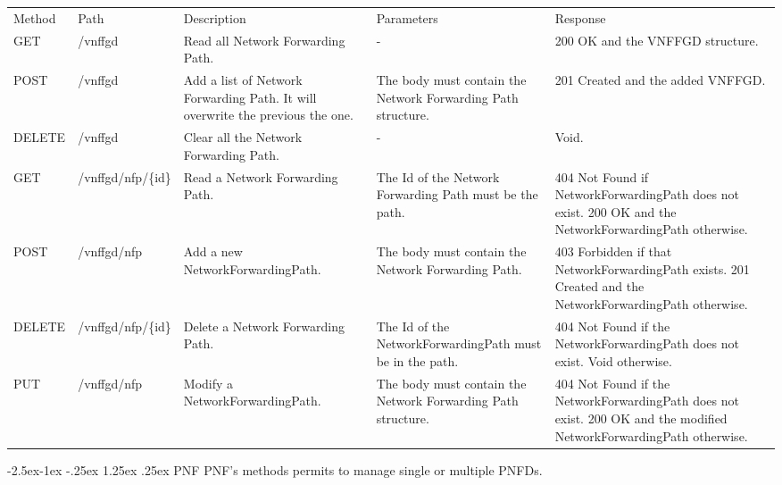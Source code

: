 \documentclass[11pt, english]{article}
\makeatletter
\renewcommand\paragraph{\@startsection{paragraph}{4}{\z@}%
            {-2.5ex\@plus -1ex \@minus -.25ex}%
            {1.25ex \@plus .25ex}%
            {\normalfont\normalsize\bfseries}}
\makeatother
\begin{document}
\begin{tabular}{ |p{2cm}|m{3cm}|p{3cm}|p{3cm}|p{4cm}| }
    \hline
    \rowcolor{black} \multicolumn{5}{|c|}{\textcolor{white}{VNFFGD}} \\
    \hline
    \rowcolor{Gray}
    Method & Path & Description & Parameters & Response \\
    \hline
    GET   & /vnffgd & Read all Network Forwarding Path. & - & 200 OK and the VNFFGD structure. \\
    \hline
    POST & /vnffgd & Add a list of Network Forwarding Path. It will overwrite the previous the one. & The body must contain the Network Forwarding Path structure. & 201 Created and the added VNFFGD. \\
    \hline
    DELETE & /vnffgd & Clear all the Network Forwarding Path. & - & Void. \\
    \hline
    GET & /vnffgd/nfp/\{id\} & Read a Network Forwarding Path. & The Id of the Network Forwarding Path must be the path. & 404 Not Found if NetworkForwardingPath does not exist. 200 OK and the NetworkForwardingPath otherwise. \\
    \hline
    POST & /vnffgd/nfp & Add a new NetworkForwardingPath. & The body must contain the Network Forwarding Path. & 403 Forbidden if that NetworkForwardingPath exists. 201 Created and the NetworkForwardingPath otherwise. \\
    \hline
    DELETE & /vnffgd/nfp/\{id\} & Delete a Network Forwarding Path. & The Id of the NetworkForwardingPath must be in the path. & 404 Not Found if the NetworkForwardingPath does not exist. Void otherwise. \\
    \hline
    PUT & /vnffgd/nfp & Modify a NetworkForwardingPath. & The body must contain the Network Forwarding Path structure. & 404 Not Found if the NetworkForwardingPath does not exist. 200 OK and the modified  NetworkForwardingPath otherwise. \\
    \hline
\end{tabular}

\newpage
\paragraph{PNF}
PNF's methods permits to manage single or multiple PNFDs. \\
\end{document}
